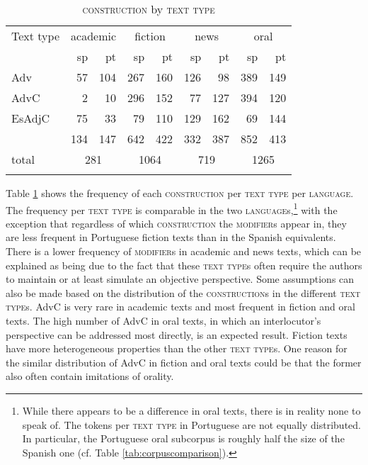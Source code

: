 \begin{table}
	\begin{tabular}{l *8{r}}
\lsptoprule
Text type	& \multicolumn{2}{c}{academic} & \multicolumn{2}{c}{fiction }& \multicolumn{2}{c}{news} & \multicolumn{2}{c}{oral} \\
		\cmidrule(lr){2-3}\cmidrule(lr){4-5}\cmidrule(lr){6-7}\cmidrule(lr){8-9}
	& sp & pt & sp & pt &sp & pt &sp & pt  \\
\midrule
	Adv & 57 &104 &267 & 160& 126&98 &389 &149 \\ 
	AdvC & 2&10 &296 &152 &77 &127 &394 &120 \\ 
	EsAdjC &75 &33 &79 &110 &129 &162 &69 &144 \\ 
\midrule

		&134  &147 &642  &422 &332 &387 &852 &413  \\\cmidrule(lr){2-3}\cmidrule(lr){4-5}\cmidrule(lr){6-7}\cmidrule(lr){8-9}
	total   & \multicolumn{2}{c}{281} & \multicolumn{2}{c}{1064} & \multicolumn{2}{c}{719} & \multicolumn{2}{c}{1265}  \\
\lspbottomrule
	\end{tabular}
\caption{\textsc{construction} by \textsc{text type}\label{tab:corpconsttext}}
\end{table}

Table \ref{tab:corpconsttext} shows the frequency of each \textsc{construction} per \textsc{text type} per \textsc{language}. The frequency per \textsc{text type} is comparable in the two \textsc{language}s,\footnote{While there appears to be a  difference in oral texts, there is in reality none to speak of. The tokens per \textsc{text type} in Portuguese are not equally distributed. In particular, the Portuguese oral subcorpus is roughly half the size of the Spanish one (cf. Table \ref{tab:corpuscomparison}).} with the exception that regardless of which \textsc{construction} the \textsc{modifier}s appear in, they are less frequent in Portuguese fiction texts than in the Spanish equivalents.   There is a lower frequency of \textsc{modifier}s in academic and news texts, which can be explained as being due to the fact that these \textsc{text type}s often require the authors to maintain or at least simulate an objective perspective. Some assumptions can also be  made based on the distribution of the \textsc{construction}s in the different \textsc{text type}s. AdvC is very rare in academic texts and most frequent in fiction and oral texts. The high number of AdvC in oral texts, in which an interlocutor's perspective can be addressed most directly, is  an expected result. Fiction texts have more heterogeneous properties than the other \textsc{text type}s. One reason for the similar distribution of AdvC in fiction and oral texts could be that the former also often contain imitations of orality.  

